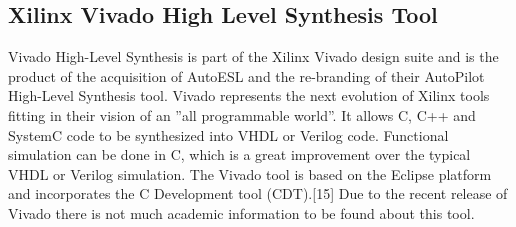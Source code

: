 \subsection{Xilinx Vivado High Level Synthesis Tool} 

Vivado High-Level Synthesis is part of the Xilinx Vivado design suite and is the product of the acquisition of AutoESL and the re-branding of their AutoPilot High-Level Synthesis tool. Vivado represents the next evolution of Xilinx tools fitting in their vision of an ''all programmable world''.  It allows C, C++ and SystemC code to be synthesized into VHDL or Verilog code. Functional simulation can be done in C, which is a great improvement over the typical VHDL or Verilog simulation. The Vivado tool is based on the Eclipse platform and incorporates the C Development tool (CDT).[15] Due to the recent release of Vivado there is not much academic information to be found about this tool.


